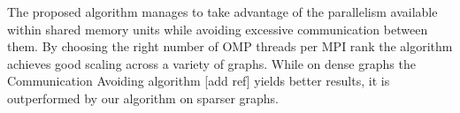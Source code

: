 The proposed algorithm manages to take advantage of the parallelism available within shared memory units while avoiding excessive communication between them. By choosing the right number of OMP threads per MPI rank the algorithm achieves good scaling across a variety of graphs. While on dense graphs the Communication Avoiding algorithm [add ref] yields better results, it is outperformed by our algorithm on sparser graphs. 